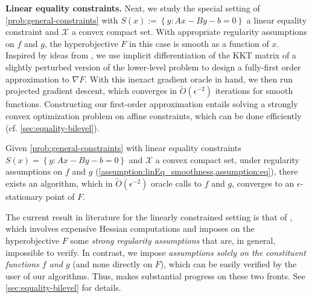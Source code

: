 \begin{description}[style=unboxed,leftmargin=0cm, itemsep=.5em, parsep=.3em, topsep=.5em]
\item[{(2)}] \textbf{Linear equality constraints.} Next, we study the special setting of \cref{prob:general-constraints} with $S(x):=\left\{y:Ax - By-b=0\right\}$ a linear equality constraint and $\mathcal{X}$ a convex compact set. With appropriate regularity assumptions on $f$ and $g$, the hyperobjective $F$ in this case is smooth as a function of $x$. Inspired by ideas from \cite{kwon2023fully}, we use implicit differentiation of the KKT matrix of a slightly perturbed version of the lower-level problem to design a fully-first order approximation to $\nabla F$. With this inexact gradient oracle in hand,  we then run projected gradient descent, which converges in $\widetilde{O}(\epsilon^{-2})$ iterations for smooth functions. Constructing our first-order approximation entails solving a strongly convex optimization problem on affine constraints, which can be done efficiently (cf. \cref{sec:equality-bilevel}). 

\begin{theorem}
\label{thm:lineq-cost-inf}
    Given \cref{prob:general-constraints} with linear equality constraints $S(x)=\left\{y:Ax-By-b=0\right\}$ and $\mathcal{X}$ a convex compact set, under regularity assumptions on $f$ and $g$ (\cref{assumption:linEq_smoothness,assumption:eq}), there exists an algorithm, which in $\widetilde{O}(\epsilon^{-2})$  oracle calls to $f$ and $g$, converges to an $\epsilon$-stationary point of $F$. 
\end{theorem}

The current result in literature for the linearly constrained setting is that of \cite{khanduri2023linearly}, which 
involves expensive Hessian computations and 
imposes on the hyperobjective $F$ some \textit{strong regularity assumptions} that are, in general, impossible to verify.
In contrast,  we impose \textit{assumptions solely on the constituent functions $f$ and $g$} (and none directly on $F$), which can be easily verified by the user of our algorithms.
Thus,  makes substantial progress on these two fronts.
See \cref{sec:equality-bilevel} for details. 


\end{description}